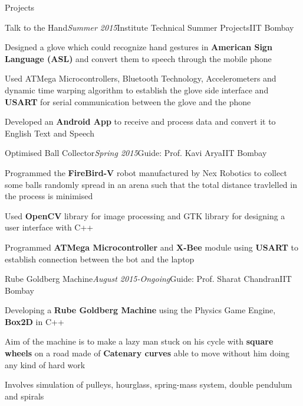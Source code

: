 \documentclass[a4paper,8pt]{resume}%
\begin{document}
\begin{rSection}{Projects}
\begin{rSubsection}{Talk to the Hand}{\textit{Summer 2015}}{Institute Technical Summer Projects}{IIT Bombay}
{
\item Designed a glove which could recognize hand gestures in \textbf{American Sign Language (ASL)} and convert them to speech through the mobile phone
\item Used ATMega Microcontrollers, Bluetooth Technology, Accelerometers and dynamic time warping algorithm to establish the glove side interface and \textbf{USART} for serial communication between the glove and the phone
\item Developed an \textbf{Android App} to receive and process data and convert it to English Text and Speech }
\end{rSubsection}

\begin{rSubsection}{Optimised Ball Collector}{\textit{Spring 2015}}{Guide: Prof. Kavi Arya}{IIT Bombay}
{
\item Programmed the \textbf{FireBird-V} robot manufactured by Nex Robotics to collect some balls randomly spread in an arena such that the total distance travlelled in the process is minimised
\item Used \textbf{OpenCV} library for image processing and GTK library for designing a user interface with C++
\item Programmed \textbf{ATMega Microcontroller} and \textbf{X-Bee} module using \textbf{USART} to establish connection between the bot and the laptop 
}
\end{rSubsection}

\begin{rSubsection}{Rube Goldberg Machine}{\textit{August 2015-Ongoing}}{Guide: Prof. Sharat Chandran}{IIT Bombay}
{
\item Developing a \textbf{Rube Goldberg Machine} using the Physics Game Engine, \textbf{Box2D} in C++
\item Aim of the machine is to make a lazy man stuck on his cycle with \textbf{square wheels} on a road made of \textbf{Catenary curves} able to move without him doing any kind of hard work
\item Involves simulation of pulleys, hourglass, spring-mass system, double pendulum and spirals 
}
\end{rSubsection}
\end{rSection}
\end{document}
